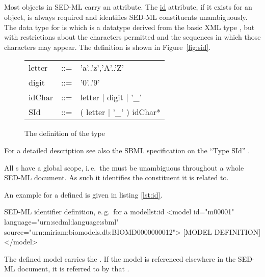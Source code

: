 \subsection{}
\label{sec:id}
%

Most objects in SED-ML carry an  attribute. 
The \hyperref[sec:id]{id} attribute, if it exists for an object, is always required and identifies SED-ML constituents unambiguously.   
The data type for  is  which is a datatype derived from the basic XML type , but with restrictions about the characters permitted and the sequences in which those characters may appear. The definition is shown in
Figure~\vref{fig:sid}.

\begin{figure}[hbt]
  \ttfamily
  \small
  \centering
  \begin{tabular}{lll}
    letter & ::= & 'a'..'z','A'..'Z'\\
    digit  & ::= & '0'..'9'\\
    idChar & ::= & letter | digit | '\_'\\
    SId    & ::= & ( letter | '\_' ) idChar*\\
  \end{tabular}
  \vspace*{-1ex}
  \caption{The definition of the type }
  \label{fig:sid}
\end{figure}

For a detailed description see also the SBML specification on the ``Type SId'' \citep[p. 11]{HBH+10}.

All s have a global scope, i.\,e.\ the  must be unambiguous throughout a whole SED-ML document. As such it identifies the constituent it is related to.

An example for a defined  is given in listing \ref{lst:id}.
%
\begin{myXmlLst}{SED-ML identifier definition, e.\,g.\ for a model}{lst:id}
<model id="m00001" language="urn:sedml:language:sbml" source="urn:miriam:biomodels.db:BIOMD0000000012">
 [MODEL DEFINITION]
</model>
\end{myXmlLst}
%
The defined model carries the   . If the model is referenced elsewhere in the SED-ML document, it is referred to by that  .

